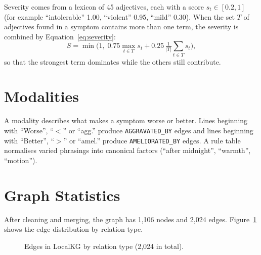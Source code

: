 \documentclass[12pt,a4paper,oneside]{report}
\newcommand{\code}[1]{\texttt{\small #1}}
\begin{document}
Severity comes from a lexicon of 45 adjectives, each with a score $s_t \in [0.2, 1]$ (for example ``intolerable'' 1.00, ``violent'' 0.95, ``mild'' 0.30). When the set $T$ of adjectives found in a symptom contains more than one term, the severity is combined by Equation~\eqref{eq:severity}:
\begin{equation}
  S = \min\Big(1,\; 0.75 \max_{t \in T} s_t + 0.25\,\tfrac{1}{|T|}\textstyle\sum_{t \in T} s_t\Big),
  \label{eq:severity}
\end{equation}
so that the strongest term dominates while the others still contribute.

\section{Modalities}
A modality describes what makes a symptom worse or better. Lines beginning with ``Worse'', ``$<$'' or ``agg.'' produce \code{AGGRAVATED\_BY} edges and lines beginning with ``Better'', ``$>$'' or ``amel.'' produce \code{AMELIORATED\_BY} edges. A rule table normalises varied phrasings into canonical factors (``after midnight'', ``warmth'', ``motion'').

\section{Graph Statistics}
After cleaning and merging, the graph has 1{,}106 nodes and 2{,}024 edges. Figure~\ref{fig:kgstats} shows the edge distribution by relation type.

\begin{figure}[H]
\centering
{}
\caption{Edges in LocalKG by relation type (2,024 in total).}
\label{fig:kgstats}
\end{figure}
\end{document}
